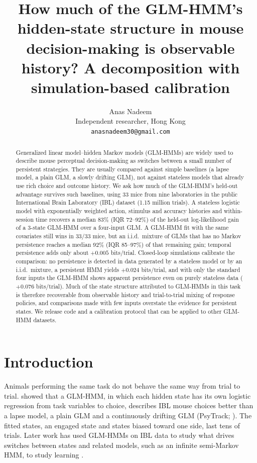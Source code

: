 \documentclass[11pt]{article}
\title{How much of the GLM-HMM's hidden-state structure in mouse decision-making is observable history? A decomposition with simulation-based calibration}
\author{Anas Nadeem\\ \small Independent researcher, Hong Kong \\ \small \texttt{anasnadeem30@gmail.com}}
\date{}
\begin{document}
\maketitle

\begin{abstract}
Generalized linear model--hidden Markov models (GLM-HMMs) are widely used to describe mouse perceptual decision-making as switches between a small number of persistent strategies. They are usually compared against simple baselines (a lapse model, a plain GLM, a slowly drifting GLM), not against stateless models that already use rich choice and outcome history. We ask how much of the GLM-HMM's held-out advantage survives such baselines, using 33 mice from nine laboratories in the public International Brain Laboratory (IBL) dataset (1.15 million trials). A stateless logistic model with exponentially weighted action, stimulus and accuracy histories and within-session time recovers a median 83\% (IQR 72--92\%) of the held-out log-likelihood gain of a 3-state GLM-HMM over a four-input GLM. A GLM-HMM fit with the same covariates still wins in 33/33 mice, but an i.i.d.\ mixture of GLMs that has no Markov persistence reaches a median 92\% (IQR 85--97\%) of that remaining gain; temporal persistence adds only about $+0.005$ bits/trial. Closed-loop simulations calibrate the comparison: no persistence is detected in data generated by a stateless model or by an i.i.d.\ mixture, a persistent HMM yields $+0.024$ bits/trial, and with only the standard four inputs the GLM-HMM shows apparent persistence even on purely stateless data ($+0.076$ bits/trial). Much of the state structure attributed to GLM-HMMs in this task is therefore recoverable from observable history and trial-to-trial mixing of response policies, and comparisons made with few inputs overstate the evidence for persistent states. We release code and a calibration protocol that can be applied to other GLM-HMM datasets.
\end{abstract}

\section{Introduction}
Animals performing the same task do not behave the same way from trial to trial. \citet{ashwood2022} showed that a GLM-HMM, in which each hidden state has its own logistic regression from task variables to choice, describes IBL mouse choices better than a lapse model, a plain GLM and a continuously drifting GLM (PsyTrack; \citealt{roy2021}). The fitted states, an engaged state and states biased toward one side, last tens of trials. Later work has used GLM-HMMs on IBL data to study what drives switches between states \citep{mohammadi2025} and related models, such as an infinite semi-Markov HMM, to study learning \citep{bruijns2025}.
\end{document}
